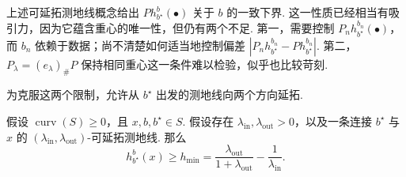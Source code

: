 上述可延拓测地线概念给出 $Ph_{b^\star}^b(\bullet)$ 关于 $b$ 的一致下界. 这一性质已经相当有吸引力，因为它蕴含重心的唯一性，但仍有两个不足. 第一，需要控制 $P_nh_{b^\star}^{b_n}(\bullet)$，而 $b_n$ 依赖于数据；尚不清楚如何适当地控制偏差 $|P_nh_{b^\star}^{b_n}-Ph_{b^\star}^{b_n}|$. 第二，$P_\lambda=(e_\lambda)_\#P$ 保持相同重心这一条件难以检验，似乎也比较苛刻.

为克服这两个限制，允许从 $b^\star$ 出发的测地线向两个方向延拓.
\begin{theorem}\label{thm:8.8}
假设 $\operatorname{curv}(S)\ge0$，且 $x,b,b^\star\in S$. 假设存在 $\lambda_{\mathrm{in}},\lambda_{\mathrm{out}}>0$，以及一条连接 $b^\star$ 与 $x$ 的 $(\lambda_{\mathrm{in}},\lambda_{\mathrm{out}})$-可延拓测地线. 那么
$$h_{b^\star}^b(x)\ge h_{\min}
=\frac{\lambda_{\mathrm{out}}}{1+\lambda_{\mathrm{out}}}-\frac1{\lambda_{\mathrm{in}}}.$$
\end{theorem}
